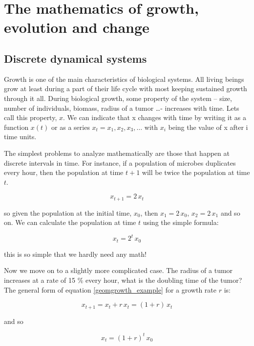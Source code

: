 \documentclass[12pt]{article}
\begin{document}
\section{The mathematics of growth, evolution and change}

\subsection{Discrete dynamical systems}

Growth is one of the main characteristics of biological systems. All living beings grow at least during a part of their life cycle with most keeping sustained growth through it all. During biological growth, some property of the system -- size, number of individuals, biomass, radius of a tumor \dots - increases with time. Lets call this property, $x$. We can indicate that x changes with time by writing it as a function $x(t)$ or as a series $x_t = x_1, x_2, x_3,\dots$ with $x_i$ being the value of x after i time units.

The simplest problems to analyze mathematically are those that happen at discrete intervals in time. For instance, if a population of microbes duplicates every hour, then the population at time $t+1$ will be twice the population at time $t$.

\begin{equation}
\label{geomgrowth_example}
x_{t+1} = 2 \, x_t
\end{equation}

so given the population at the initial time,  $x_0$, then $x_1=2\, x_0$, $x_2=2\, x_1$ and so on. We can calculate the population at time $t$ using the simple formula:

\begin{equation}
x_{t} = 2^t \, x_0
\end{equation}

this is so simple that we hardly need any math!

Now we move on to a slightly more complicated case. The radius of a tumor increases at a rate of  15 \% every hour, what is the doubling time of the tumor? The general form of equation \ref{geomgrowth_example} for a growth rate $r$ is:

\begin{equation}
\label{geomgrowth_general}
x_{t+1} = x_t  + r \, x_t =(1 + r) \, x_t
\end{equation}

and so

\begin{equation}
\label{geomgrowth_general2}
x_{t} = (1 + r)^{t} \, x_0
\end{equation}
\end{document}

